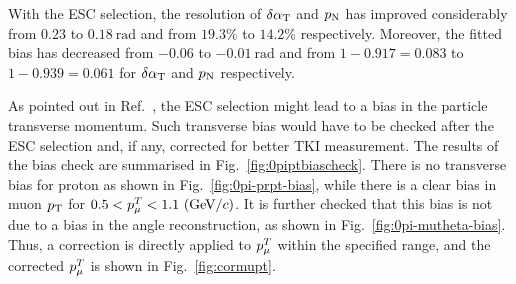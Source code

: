         With the ESC selection, the resolution of $\delta\alpha_\textrm{T}$ and $p_\textrm{N}$ has improved considerably from $0.23$ to $0.18~\textrm{rad}$ and from $19.3\%$ to $14.2\%$ respectively. Moreover, the fitted bias has decreased from $-0.06$ to $-0.01~\textrm{rad}$ and from $1-0.917=0.083$ to $1-0.939=0.061$ for $\delta\alpha_\textrm{T}$ and $p_\textrm{N}$ respectively.  

        As pointed out in Ref.~\cite{Lu:2016mjf}, the ESC selection might lead to a bias in the particle transverse momentum. 
        Such transverse bias would have to be checked after the ESC selection and, if any, corrected for better TKI measurement. 
        The results of the bias check are summarised in Fig.~\ref{fig:0piptbiascheck}. 
        There is no transverse bias for proton as shown in Fig.~\ref{fig:0pi-prpt-bias}, while there is a clear bias in muon $p_\textrm{T}$ for $0.5<p_{\mu}^T<1.1~(\textrm{GeV}/c)$. 
        It is further checked that this bias is not due to a bias in the angle reconstruction, as shown in Fig.~\ref{fig:0pi-mutheta-bias}.
        Thus, a correction is directly applied to $p_{\mu}^T$ within the specified range, and the corrected $p_{\mu}^T$ is shown in Fig.~\ref{fig:cormupt}.

